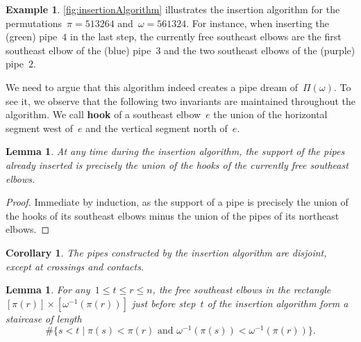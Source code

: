 \documentclass{amsart}
\newtheorem{corollary}[theorem]{Corollary}
\newtheorem{lemma}[theorem]{Lemma}
\theoremstyle{definition}
\newtheorem{example}[theorem]{Example}
\newcommand{\bigset}[2]{\big\{ #1 \;|\; #2 \big\}} %
\newcommand{\defn}[1]{\textbf{\textsf{\color{PineGreen} #1}}} %
\newcommand{\pipeDreams}{\Pi} %
\begin{document}
\begin{example}
\label{exm:insertionAlgorithm}
\cref{fig:insertionAlgorithm} illustrates the insertion algorithm for the permutations~${\pi = 513264}$ and~${\omega = 561324}$.
For instance, when inserting the (green) pipe~$4$ in the last step, the currently free southeast elbows are the first southeast elbow of the (blue) pipe~$3$ and the two southeast elbows of the (purple) pipe~$2$.
\end{example}

We need to argue that this algorithm indeed creates a pipe dream of~$\pipeDreams(\omega)$.
To see it, we observe that the following two invariants are maintained throughout the algorithm.
We call \defn{hook} of a southeast elbow~$e$ the union of the horizontal segment west of~$e$ and the vertical segment north of~$e$.

\begin{lemma}
\label{lem:disjointPipesInsertionAlgorithm}
At any time during the insertion algorithm, the support of the pipes already inserted is precisely the union of the hooks of the currently free southeast elbows.
\end{lemma}

\begin{proof}
Immediate by induction, as the support of a pipe is precisely the union of the hooks of its southeast elbows minus the union of the pipes of its northeast elbows.
\end{proof}

\begin{corollary}
\label{coro:disjointPipesInsertionAlgorithm}
The pipes constructed by the insertion algorithm are disjoint, except at crossings and contacts.
\end{corollary}

\begin{lemma}
\label{lem:rectangleInsertionAlgorithm}
For any~$1 \le t \le r \le n$, the free southeast elbows in the rectangle~$[\pi(r)] \times [\omega^{-1}(\pi(r))]$ just before step~$t$ of the insertion algorithm form a staircase of length
\[
{\# \bigset{s < t}{\pi(s) < \pi(r) \text{ and } \omega^{-1}(\pi(s)) < \omega^{-1}(\pi(r))}}.
\]
\end{lemma}
\end{document}
